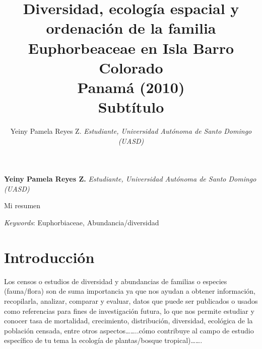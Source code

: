 \documentclass[11pt,]{article}
\title{Diversidad, ecología espacial y ordenación de la familia Euphorbeaceae
en Isla Barro Colorado\\
Panamá (2010)\\
Subtítulo  }
\author{\Large Yeiny Pamela Reyes Z.\vspace{0.05in} \newline\normalsize\emph{Estudiante, Universidad Autónoma de Santo Domingo (UASD)}  }
\date{}
\newcommand*{\authorfont}{\fontfamily{phv}\selectfont}
\renewenvironment{abstract}
 {{%
    \setlength{\leftmargin}{0mm}
    \setlength{\rightmargin}{\leftmargin}%
  }%
  \relax}
 {\endlist}
\begin{document}
	
%

{%
\setlength{\parindent}{0pt}
\thispagestyle{plain}
{\fontsize{18}{20}\selectfont\raggedright 
\maketitle  %

}

{
   \vskip 13.5pt\relax \normalsize\fontsize{11}{12} 
\textbf{\authorfont Yeiny Pamela Reyes Z.} \hskip 15pt \emph{\small Estudiante, Universidad Autónoma de Santo Domingo (UASD)}   

}

}








\begin{abstract}

    \hbox{\vrule height .2pt width 39.14pc}

    \vskip 8.5pt %

\noindent Mi resumen


\vskip 8.5pt \noindent \emph{Keywords}: Euphorbiaceae, Abundancia/diversidad \par

    \hbox{\vrule height .2pt width 39.14pc}



\end{abstract}


\vskip 6.5pt


\noindent  \section{Introducción}\label{introducciuxf3n}

Los censos o estudios de diversidad y abundancias de familias o especies
(fauna/flora) son de suma importancia ya que nos ayudan a obtener
información, recopilarla, analizar, comparar y evaluar, datos que puede
ser publicados o usados como referencias para fines de investigación
futura, lo que nos permite estudiar y conocer tasa de mortalidad,
crecimiento, distribución, diversidad, ecológica de la población
censada, entre otros aspectos\ldots{}\ldots{}..cómo contribuye al campo
de estudio específico de tu tema la ecología de plantas/bosque
tropical)\ldots{}\ldots{}.
\end{document}
